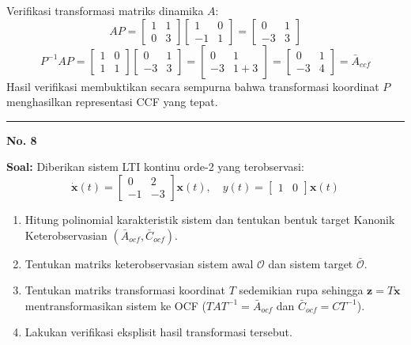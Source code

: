 \documentclass[11pt,a4paper]{article}
\begin{document}
Verifikasi transformasi matriks dinamika $A$:
$$A P = \begin{bmatrix} 1 & 1 \\ 0 & 3 \end{bmatrix} \begin{bmatrix} 1 & 0 \\ -1 & 1 \end{bmatrix} = \begin{bmatrix} 0 & 1 \\ -3 & 3 \end{bmatrix}$$
$$P^{-1} A P = \begin{bmatrix} 1 & 0 \\ 1 & 1 \end{bmatrix} \begin{bmatrix} 0 & 1 \\ -3 & 3 \end{bmatrix} = \begin{bmatrix} 0 & 1 \\ -3 & 1 + 3 \end{bmatrix} = \begin{bmatrix} 0 & 1 \\ -3 & 4 \end{bmatrix} = \bar{A}_{ccf}$$
Hasil verifikasi membuktikan secara sempurna bahwa transformasi koordinat $P$ menghasilkan representasi CCF yang tepat.

\vspace{12pt}
\hrule
\vspace{10pt}

\textbf{\large No. 8}

\textbf{Soal:}  
Diberikan sistem LTI kontinu orde-2 yang terobservasi:
$$\dot{\mathbf{x}}(t) = \begin{bmatrix} 0 & 2 \\ -1 & -3 \end{bmatrix} \mathbf{x}(t), \quad y(t) = \begin{bmatrix} 1 & 0 \end{bmatrix} \mathbf{x}(t)$$
\begin{enumerate}[label=(\alph*)]
    \item Hitung polinomial karakteristik sistem dan tentukan bentuk target Kanonik Keterobservasian $(\bar{A}_{ocf}, \bar{C}_{ocf})$.
    \item Tentukan matriks keterobservasian sistem awal $\mathcal{O}$ dan sistem target $\bar{\mathcal{O}}$.
    \item Tentukan matriks transformasi koordinat $T$ sedemikian rupa sehingga $\mathbf{z} = T \mathbf{x}$ mentransformasikan sistem ke OCF ($T A T^{-1} = \bar{A}_{ocf}$ dan $\bar{C}_{ocf} = C T^{-1}$).
    \item Lakukan verifikasi eksplisit hasil transformasi tersebut.
\end{enumerate}
\end{document}
